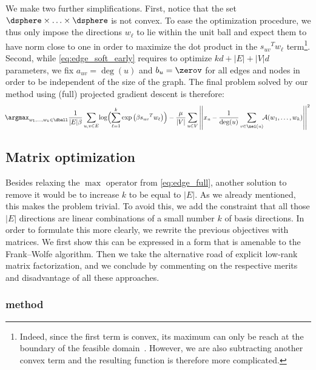 We make two further simplifications. First, notice that the set $\dsphere \times \ldots \times
\dsphere$ is not convex. To ease
the optimization procedure, we thus only impose the directions $w_\ell$ to lie within the unit ball
and expect them to have norm close to one in order to maximize the dot product in the ${s_{uv}}^T
w_\ell$ term\footnote{Indeed, since the first term is convex, its maximum can only be reach at the
boundary of the feasible domain~\autocite[Theorem 32.1]{convexAnalysis70}. However, we are also
subtracting another convex term and the resulting function is therefore more complicated.}.
Second, while \eqref{eq:edge_soft_early} requires to optimize
$kd + |E| + |V|d$ parameters, we fix $a_{uv} = \deg(u)$ and $b_u = \zerov$ for all edges and nodes in order
to be independent of the size of the graph. The final problem solved by our \combined{} method using
(full) projected gradient descent is therefore:
\begin{equation}
  \label{eq:edge_soft}
\!  \argmax_{w_1,\ldots,w_k \in \dball}
  \frac{1}{|E|\beta} \sum_{u,v\in E}\!
  \log\Bigl(\sum_{\ell=1}^k\exp\left(\beta {s_{uv}}^T w_\ell \right)\Bigr)
  - \frac{\mu}{|V|}\sum_{u\in V} \left|\left| x_u  - \frac{1}{\deg(u)}
  \sum_{v \in \nei(u)}\!\! \mathcal{A}(w_1,\ldots,w_k) \right|\right|^2
\end{equation}

\subsection{Matrix optimization}
\label{sub:edge_matrix}

Besides relaxing the $\max$ operator from \eqref{eq:edge_full}, another solution to remove it would
be to increase $k$ to be equal to $|E|$. As we already mentioned, this makes the problem trivial. To
avoid this, we add the constraint that all those $|E|$ directions are linear combinations of a small
number $k$ of basis directions. In order to formulate this more clearly, we rewrite the previous
objectives with matrices. We first show this can be expressed in a form that is amenable to the
Frank--Wolfe algorithm. Then we take the alternative road of explicit low-rank matrix factorization,
and we conclude by commenting on the respective merits and disadvantage of all these approaches.

\subsubsection{\fwa{} method}
\label{ssub:edge_frank_wolfe}

